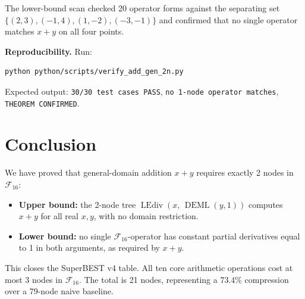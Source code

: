 \documentclass[12pt,a4paper]{article}
\theoremstyle{definition}
\newcommand{\DEML}{\operatorname{DEML}}
\newcommand{\LEdiv}{\operatorname{LEdiv}}
\newcommand{\F}{\mathcal{F}_{16}}
\begin{document}
The lower-bound scan checked 20 operator forms against the separating set
$\{(2,3),(-1,4),(1,-2),(-3,-1)\}$ and confirmed that no single operator
matches $x+y$ on all four points.

\bigskip

\noindent\textbf{Reproducibility.}
Run:
\begin{verbatim}
python python/scripts/verify_add_gen_2n.py
\end{verbatim}
Expected output: \texttt{30/30 test cases PASS}, \texttt{no 1-node operator
matches}, \texttt{THEOREM CONFIRMED}.

\section{Conclusion}
\label{sec:conclusion}

We have proved that general-domain addition $x + y$ requires exactly 2 nodes
in $\mathcal{F}_{16}$:
\begin{itemize}
  \item \textbf{Upper bound:} the 2-node tree $\LEdiv(x,\,\DEML(y,1))$
    computes $x+y$ for all real $x, y$, with no domain restriction.
  \item \textbf{Lower bound:} no single $\F$-operator has constant partial
    derivatives equal to 1 in both arguments, as required by $x+y$.
\end{itemize}
This closes the SuperBEST v4 table.
All ten core arithmetic operations cost at most 3 nodes in $\F$.
The total is 21 nodes, representing a 73.4\% compression over a 79-node
naive baseline.
\end{document}
